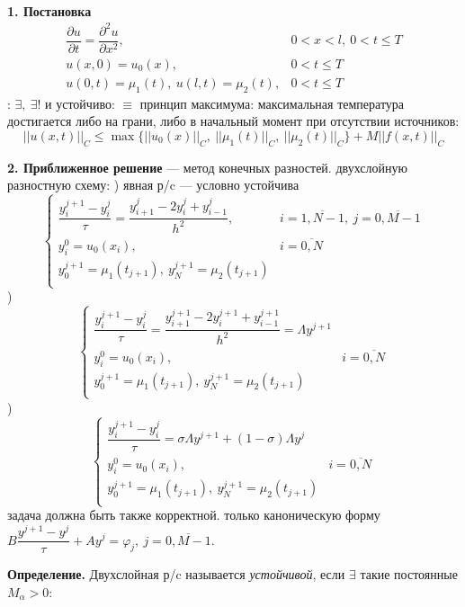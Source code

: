 \documentclass[9pt]{article}
\begin{document}
\ 
\par\textbf{1. Постановка}
\[\begin{array}{ll}
    \dfrac{\partial u}{\partial t}=\dfrac{\partial^2u}{\partial x^2}, & 0<x<l,\ 0<t\le T \\
    u(x,0)=u_0(x), & 0<t\le T\\
    u(0,t)=\mu_1(t),\ u(l,t)=\mu_2(t), & 0<t\le T
\end{array}\]
: \(\exists,\ \exists!\) и устойчиво:
 \(\equiv\) принцип максимума: максимальная температура достигается либо на грани, либо в начальный момент при отсутствии источников:
\[||u(x,t)||_C\le\max\{||u_0(x)||_C,\ ||\mu_1(t)||_C,\ ||\mu_2(t)||_C\}+M||f(x,t)||_C\]
\par\textbf{2. Приближенное решение} --- метод конечных разностей.
\parПрименим двухслойную разностную схему:
) явная р/c --- условно устойчива
\[\left\{
\begin{array}{ll}
    \dfrac{y_i^{j+1}-y_i^j}{\tau}=\dfrac{y_{i+1}^j-2y_i^j+y_{i-1}^j}{h^2}, & i=\overline{1,N-1},\ j=\overline{0,M-1} \\
    y_i^0=u_0(x_i), & i=\overline{0,N} \\
    y_0^{j+1}=\mu_1(t_{j+1}),\ y_N^{j+1}=\mu_2(t_{j+1}) & \\
\end{array}
\right.\]
) 
\[\left\{
\begin{array}{ll}
    \dfrac{y^{j+1}_i-y_i^j}{\tau}=\dfrac{y_{i+1}^{j+1}-2y_i^{j+1}+y_{i-1}^{j+1}}{h^2}=\Lambda y^{j+1} &  \\
    y_i^0=u_0(x_i), & i=\overline{0,N} \\
    y_0^{j+1}=\mu_1(t_{j+1}),\ y_N^{j+1}=\mu_2(t_{j+1}) & \\
\end{array}
\right.\]
)
\[\left\{
\begin{array}{ll}
    \dfrac{y_i^{j+1}-y_i^j}{\tau}=\sigma\Lambda y^{j+1}+(1-\sigma)\Lambda y^j &  \\
    y_i^0=u_0(x_i), & i=\overline{0,N} \\
    y_0^{j+1}=\mu_1(t_{j+1}),\ y_N^{j+1}=\mu_2(t_{j+1}) & \\
\end{array}
\right.\]
 задача должна быть также корректной.
 только каноническую форму \(B\dfrac{y^{j+1}-y^j}{\tau}+Ay^j=\varphi_j,\ j=\overline{0,M-1}\).
\par\textbf{Определение.} Двухслойная р/c называется \textit{устойчивой}, если \(\exists\) такие постоянные \(M_\alpha>0\):
\end{document}
